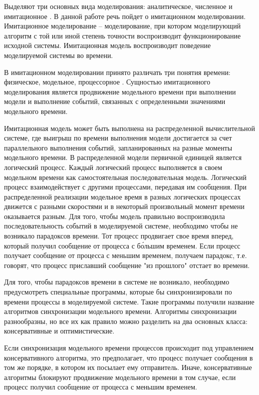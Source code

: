 Выделяют три основных вида моделирования: аналитическое, численное и имитационное \cite{disksobmod}. В данной работе речь пойдет о имитационном моделировании. Имитационное моделирование -- моделирование, при котором моделирующий алгоритм с той или иной степень точности воспроизводит функционирование исходной системы. Имитационная модель воспроизводит поведение моделируемой системы во времени.

В имитационном моделировании принято различать три понятия времени: физическое, модельное, процессорное \cite{okol}. Сущностью имитационного моделирования является продвижение модельного времени при выполнении модели и выполнение событий, связанных с определенными значениями модельного времени.

Имитационная модель может быть выполнена на распределенной вычислительной системе, где выигрыш по времени выполнения модели достигается за счет параллельного выполнения событий, запланированных на разные моменты модельного времени. В распределенной модели первичной единицей является логический процесс. Каждый логический процесс выполняется в своем модельном времени как самостоятельная последовательная модель. Логический процесс взаимодействует с другими процессами, передавая им сообщения. При распределенной реализации модельное время в разных логических процессах движется с разными скоростями и в некоторый произвольный момент времени оказывается разным. Для того, чтобы модель правильно воспроизводила последовательность событий в моделируемой системе, необходимо чтобы не возникало парадоксов времени. Тот процесс продвигает свое время вперед, который получил сообщение от процесса с б\'ольшим временем. Если процесс получает сообщение от процесса с меньшим временем, получаем парадокс, т.е. говорят, что процесс приславший сообщение "из прошлого" отстает во времени.

Для того, чтобы парадоксов времени в системе не возникало, необходимо предусмотреть специальные программы, которые бы синхронизировали по времени процессы в моделируемой системе. Такие программы получили название алгоритмов синхронизации модельного времени. Алгоритмы синхронизации разнообразны, но все их как правило можно разделить на два основных класса: консервативные и оптимистические.

Если синхронизация модельного времени процессов происходит под управлением консервативного алгоритма, это предполагает, что процесс получает сообщения в том же порядке, в котором их посылает ему отправитель.
Иначе, консервативные алгоритмы блокируют продвижение модельного времени в том случае, если процесс получил сообщение от процесса с меньшим временем.

